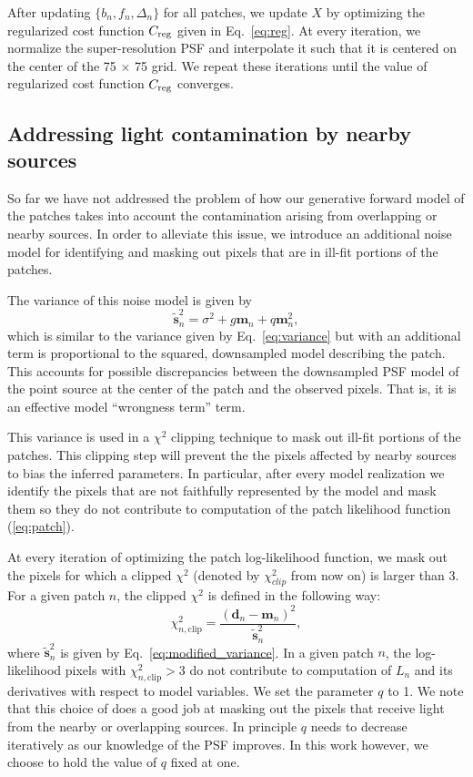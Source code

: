 \documentclass[onecolumn]{aastex61}
\newcommand{\beq}{\begin{equation}}
\newcommand{\eeq}{\end{equation}}
\begin{document}
After updating $\{b_n, f_n, \Delta_n\}$ for all patches, we update $X$ 
by optimizing the regularized cost function $C_{\rm reg}$ given in Eq.~\ref{eq:reg}. At every iteration, we normalize the super-resolution PSF and 
interpolate it such that it is centered on the center of the 75 $\times$ 75 grid. We repeat these iterations until the value of regularized cost function 
$C_{\rm reg}$ converges.

\subsection{Addressing light contamination by nearby sources}

So far we have not addressed the problem of how our generative forward model of the patches takes into account the contamination arising from overlapping 
or nearby sources. In order to alleviate this issue, we introduce an additional noise model for identifying and masking out pixels that are 
in ill-fit portions of the patches.

The variance of this noise model is given by
\beq
\tilde{\mathbf{s}}_n^2 = \sigma^{2} + g\mathbf{m}_{n} + q\mathbf{m}_{n}^{2},
\label{eq:modified_variance}
\eeq 
which is similar to the variance given by Eq.~\ref{eq:variance} but with an additional term is 
proportional to the squared, downsampled model describing the patch. This accounts for possible discrepancies between the downsampled PSF model of the 
point source at the center of the patch and the observed pixels. That is, it is an effective model ``wrongness term'' term. 

This variance is used in a $\chi^2$ clipping technique to mask out ill-fit portions of the patches. 
This clipping step will prevent the the pixels affected by nearby sources to bias the inferred parameters.
In particular, after every model realization we identify the pixels that are not faithfully represented by the model and mask them so they do not 
contribute to computation of the patch likelihood function (\ref{eq:patch}).
 
At every iteration of optimizing the patch log-likelihood function, we mask out the pixels for which a clipped $\chi^{2}$ 
(denoted by $\chi^{2}_{clip}$ from now on) is larger than 3. For a given patch $n$, the clipped $\chi^{2}$ is defined in the following way:
\beq
\chi^{2}_{n,\mathrm{clip}} = \frac{(\mathbf{d}_{n} - \mathbf{m}_{n})^{2}}{\tilde{\mathbf{s}}_{n}^{2}}, 
\label{eq:chi_clip}
\eeq
where $\tilde{\mathbf{s}}_{n}^{2}$ is given by Eq.~\ref{eq:modified_variance}. In a given patch $n$, the log-likelihood pixels with $\chi^{2}_{n,\mathrm{clip}} > 3$ 
do not contribute to computation of $L_n$ and its derivatives with respect to model variables. 
We set the parameter $q$ to 1. We note that this choice of does a good job at masking out the pixels that receive light from the nearby or overlapping sources. 
In principle $q$ needs to decrease iteratively as our knowledge of the PSF improves. In this work however, we choose to hold the value of $q$ fixed at one. 
\end{document}
